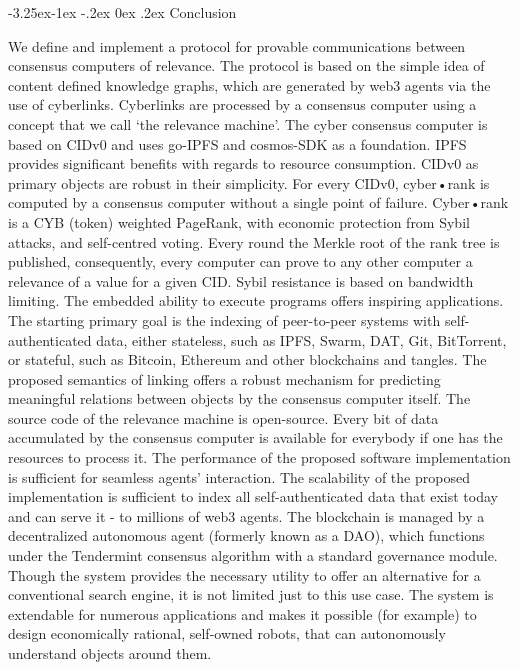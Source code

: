 \documentclass[8pt,oneside]{amsart}
\makeatletter
\renewcommand\subsection{\@startsection{subsection}{2}{\z@}%
                                     {-3.25ex\@plus -1ex \@minus -.2ex}%
                                     {0ex \@plus .2ex}%
                                     {\play\Large}}%
\newcommand{\titleSection}[1]{\subsection{#1}}
\newcommand{\code}[1]{{\PlayBold #1}}
\makeatother
\begin{document}
\begin{Abstract}
\titleSection{Conclusion}\label{Conclusion}

We define and implement a protocol for provable communications between consensus computers of relevance.
The protocol is based on the simple idea of content defined knowledge graphs, which are generated by web3 agents via the use of cyberlinks.
Cyberlinks are processed by a consensus computer using a concept that we call ‘the relevance machine’.
The \code{cyber} consensus computer is based on \code{CIDv0} and uses \code{go-IPFS} and \code{cosmos-SDK} as a foundation. IPFS provides significant benefits with regards to resource consumption. CIDv0 as primary objects are robust in their simplicity. For every CIDv0, cyber•rank is computed by a consensus computer without a single point of failure. Cyber•rank is a CYB (token) weighted PageRank, with economic protection from Sybil attacks, and self-centred voting. Every round the Merkle root of the rank tree is published, consequently, every computer can prove to any other computer a relevance of a value for a given CID. Sybil resistance is based on bandwidth limiting. The embedded ability to execute programs offers inspiring applications. The starting primary goal is the indexing of peer-to-peer systems with self-authenticated data, either stateless, such as IPFS, Swarm, DAT, Git, BitTorrent, or stateful, such as Bitcoin, Ethereum and other blockchains and tangles. The proposed semantics of linking offers a robust mechanism for predicting meaningful relations between objects by the consensus computer itself. The source code of the relevance machine is open-source. Every bit of data accumulated by the consensus computer is available for everybody if one has the resources to process it. The performance of the proposed software implementation is sufficient for seamless agents' interaction. The scalability of the proposed implementation is sufficient to index all self-authenticated data that exist today and can serve it - to millions of web3 agents. The blockchain is managed by a decentralized autonomous agent (formerly known as a DAO), which functions under the Tendermint consensus algorithm with a standard governance module. Though the system provides the necessary utility to offer an alternative for a conventional search engine, it is not limited just to this use case. The system is extendable for numerous applications and makes it possible (for example) to design economically rational, self-owned robots, that can autonomously understand objects around them.


\end{Abstract}
\end{document}
